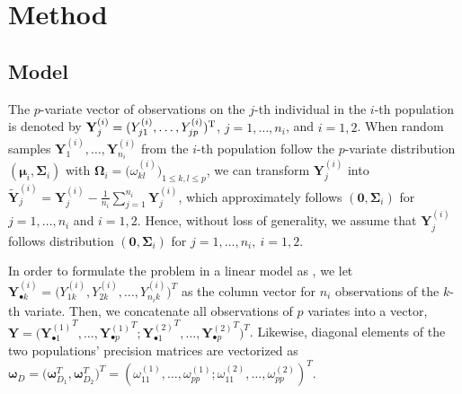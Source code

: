 \documentclass[useAMS,usenatbib,referee]{bio}
\newcommand{\bs}{\boldsymbol}
\begin{document}
{\section{Method}

\subsection{Model}
The $p$-variate vector of observations on the $j$-th individual in the $i$-th population is denoted by $\mathbf{Y}^{(i)}_j = (Y_{j1}^{(i)}, \ldots, Y_{jp}^{(i)})^{\rm
T}$, $j=1, \ldots, n_i$, and $i=1,2$.
When random samples $\mathbf{Y}^{(i)}_1, \dots, \mathbf{Y}^{(i)}_{n_i}$ from
the $i$-th population follow the $p$-variate distribution 
$(\bs{\mu}_i,\bs{\Sigma}_i)$ with $\bs{\Omega}_i=
\big( \omega^{(i)}_{kl} \big)_{1 \le k,l \le p}$,
we can transform $\mathbf{Y}^{(i)}_{j}$ into $\tilde{\mathbf{Y}}^{(i)}_j = \mathbf{Y}^{(i)}_j - \frac{1}{n_i} \sum_{j=1}^{n_i} \mathbf{Y}^{(i)}_j$,
which approximately follows $(\mathbf{0},\bs{\Sigma}_i)$ for $j=1,\ldots,n_i$ and $i=1,2$.
Hence, without loss of generality, we assume that $\mathbf{Y}^{(i)}_j$ follows distribution $(\mathbf{0},\bs{\Sigma}_i)$ for $j=1,\ldots,n_i,~i=1,2$.

In order to formulate the problem in a linear model as \citet{Peng:2009}, we let
$\mathbf{Y}^{(i)}_{\bullet k} = \big(Y_{1k}^{(i)}, Y_{2k}^{(i)},\ldots,Y_{n_ik}^{(i)} \big)^T$ as the column vector for $n_i$ observations of the $k$-th variate.
Then, we concatenate all observations of $p$ variates into a vector,  
$\mathbf{Y} = \big(
 {\mathbf{Y}^{(1)}_{\bullet 1}}^T, \ldots,{\mathbf{Y}^{(1)}_{\bullet p}}^T;
 {\mathbf{Y}^{(2)}_{\bullet 1}}^T, \ldots, {\mathbf{Y}^{(2)}_{\bullet p}}^T \big)^T$. 
Likewise, diagonal elements of the two populations' precision matrices are vectorized as
$\bs{\omega}_D=\big(\bs{\omega}_{D_1}^T, \bs{\omega}_{D_2}^T\big)^T =
(\omega^{(1)}_{11},\ldots,\omega^{(1)}_{pp};\omega^{(2)}_{11},\ldots,\omega^{(2)}_{pp})^T.$

}
\end{document}
